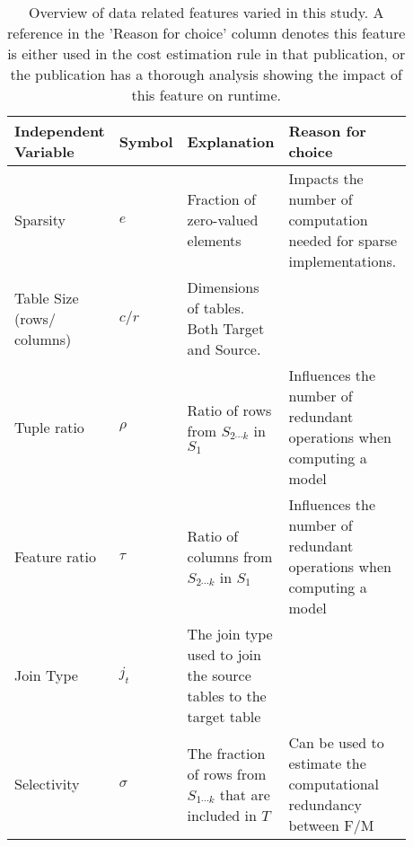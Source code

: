 \begingroup
\renewcommand{\arraystretch}{1.5}
\begin{table}[t]
    \centering
    \begin{tabular}{p{0.16\linewidth}p{0.09\linewidth}p{0.23\linewidth}p{0.4\linewidth}}
        \toprule
        Independent Variable       & Symbol   & Explanation                                                        & Reason for choice                                                                                                           \\ \midrule \midrule
        Sparsity                   & $e$      & Fraction of zero-valued elements                                   & Impacts the number of computation needed for sparse implementations. \cite{MorpheusFI, morpheus, schijndel_cost_estimation} \\
        Table Size (rows/ columns) & $c/r$    & Dimensions of tables. Both Target and Source.                      & \cite{morpheus}                                                                                                             \\
        Tuple ratio                & $\rho$   & Ratio of rows from $S_{2\cdots k}$ in $S_1$                        & Influences the number of redundant operations when computing a model\cite{morpheus}                                         \\
        Feature ratio              & $\tau$   & Ratio of columns from $S_{2\cdots k}$ in $S_1$                     & Influences the number of redundant operations when computing a model\cite{morpheus}                                         \\
        Join Type                  & $j_t$    & The join type used to join the source tables to the target table   & \cite{schijndel_cost_estimation}                                                                                            \\
        Selectivity                & $\sigma$ & The fraction of rows from $S_{1\cdots k}$ that are included in $T$ & Can be used to estimate the computational redundancy between F/M \cite{MorpheusFI}                                          \\
        \bottomrule
    \end{tabular}
    \caption[Overview of data related features varied in this study]{Overview of data related features varied in this study. A reference in the 'Reason for choice' column denotes this feature is either used in the cost estimation rule in that publication, or the publication has a thorough analysis showing the impact of this feature on runtime.}
    \label{tab:4-data_chars}
\end{table}
\endgroup

